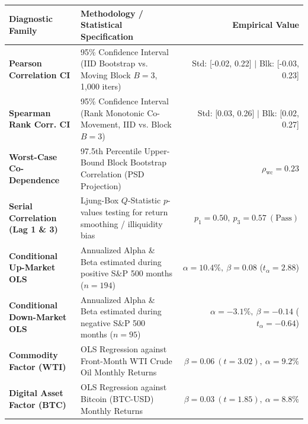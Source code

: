 \documentclass[10pt,a4paper]{article}
\begin{document}
\vspace{0.45em}

\begin{tcolorbox}[colback=white, colframe=primary, title=\textbf{\small\strut Appendix A: Extended Statistical, Bootstrap \& Factor Diagnostics}, fonttitle=\sffamily\bfseries\small, arc=5pt, boxrule=0.8pt, toptitle=4pt, bottomtitle=4pt, left=6pt, right=6pt, top=3.5pt, bottom=3.5pt, colbacktitle=primary]
\renewcommand{\arraystretch}{1.22}
\scriptsize
\begin{tabularx}{\textwidth}{l X r}
\toprule
\textbf{\textcolor{primary}{Diagnostic Family}} & \textbf{\textcolor{primary}{Methodology / Statistical Specification}} & \textbf{\textcolor{primary}{Empirical Value}} \\
\midrule
\textbf{Pearson Correlation CI} & 95\% Confidence Interval (IID Bootstrap vs. Moving Block $B=3$, 1,000 iters) & Std: [-0.02, 0.22] $\vert$ Blk: [-0.03, 0.23] \\
\rowcolor{cardbg} \textbf{Spearman Rank Corr. CI} & 95\% Confidence Interval (Rank Monotonic Co-Movement, IID vs. Block $B=3$) & Std: [0.03, 0.26] $\vert$ Blk: [0.02, 0.27] \\
\textbf{Worst-Case Co-Dependence} & 97.5th Percentile Upper-Bound Block Bootstrap Correlation (PSD Projection) & $\rho_{\text{wc}} = 0.23$ \\
\rowcolor{cardbg} \textbf{Serial Correlation (Lag 1 \& 3)} & Ljung-Box $Q$-Statistic $p$-values testing for return smoothing / illiquidity bias & $p_1=0.50,\ p_3=0.57\ (\text{Pass})$ \\
\textbf{Conditional Up-Market OLS} & Annualized Alpha \& Beta estimated during positive S\&P 500 months ($n=194$) & $\alpha=10.4\%,\ \beta=0.08$ ($t_\alpha=2.88$) \\
\rowcolor{cardbg} \textbf{Conditional Down-Market OLS} & Annualized Alpha \& Beta estimated during negative S\&P 500 months ($n=95$) & $\alpha=-3.1\%,\ \beta=-0.14$ ($t_\alpha=-0.64$) \\
\textbf{Commodity Factor (WTI)} & OLS Regression against Front-Month WTI Crude Oil Monthly Returns & $\beta=0.06\ (t=3.02),\ \alpha=9.2\%$ \\
\rowcolor{cardbg} \textbf{Digital Asset Factor (BTC)} & OLS Regression against Bitcoin (BTC-USD) Monthly Returns & $\beta=0.03\ (t=1.85),\ \alpha=8.8\%$ \\
\bottomrule
\end{tabularx}
\end{tcolorbox}
\end{document}
